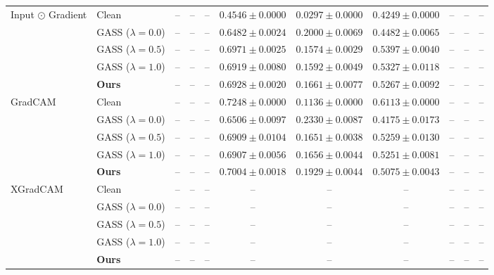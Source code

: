 \begin{table}[t]
{\begin{tabular}{ll|ccc|ccc|ccc}
\multirow{5}{*}{Input $\odot$ Gradient}
& Clean & -- & -- & -- & $0.4546 \pm 0.0000$ & $\mathbf{0.0297 \pm 0.0000}$ & $0.4249 \pm 0.0000$ & -- & -- & -- \\
& GASS ($\lambda=0.0$) & -- & -- & -- & $0.6482 \pm 0.0024$ & $0.2000 \pm 0.0069$ & $0.4482 \pm 0.0065$ & -- & -- & -- \\
& GASS ($\lambda=0.5$) & -- & -- & -- & $\mathbf{0.6971 \pm 0.0025}$ & $0.1574 \pm 0.0029$ & $\mathbf{0.5397 \pm 0.0040}$ & -- & -- & -- \\
& GASS ($\lambda=1.0$) & -- & -- & -- & $0.6919 \pm 0.0080$ & $0.1592 \pm 0.0049$ & $0.5327 \pm 0.0118$ & -- & -- & -- \\
& \textbf{Ours} & -- & -- & -- & $0.6928 \pm 0.0020$ & $0.1661 \pm 0.0077$ & $0.5267 \pm 0.0092$ & -- & -- & -- \\
\midrule

\multirow{5}{*}{GradCAM}
& Clean & -- & -- & -- & $\mathbf{0.7248 \pm 0.0000}$ & $\mathbf{0.1136 \pm 0.0000}$ & $\mathbf{0.6113 \pm 0.0000}$ & -- & -- & -- \\
& GASS ($\lambda=0.0$) & -- & -- & -- & $0.6506 \pm 0.0097$ & $0.2330 \pm 0.0087$ & $0.4175 \pm 0.0173$ & -- & -- & -- \\
& GASS ($\lambda=0.5$) & -- & -- & -- & $0.6909 \pm 0.0104$ & $0.1651 \pm 0.0038$ & $0.5259 \pm 0.0130$ & -- & -- & -- \\
& GASS ($\lambda=1.0$) & -- & -- & -- & $0.6907 \pm 0.0056$ & $0.1656 \pm 0.0044$ & $0.5251 \pm 0.0081$ & -- & -- & -- \\
& \textbf{Ours} & -- & -- & -- & $0.7004 \pm 0.0018$ & $0.1929 \pm 0.0044$ & $0.5075 \pm 0.0043$ & -- & -- & -- \\
\midrule

\multirow{5}{*}{XGradCAM}
& Clean & -- & -- & -- & -- & -- & -- & -- & -- & -- \\
& GASS ($\lambda=0.0$) & -- & -- & -- & -- & -- & -- & -- & -- & -- \\
& GASS ($\lambda=0.5$) & -- & -- & -- & -- & -- & -- & -- & -- & -- \\
& GASS ($\lambda=1.0$) & -- & -- & -- & -- & -- & -- & -- & -- & -- \\
& \textbf{Ours} & -- & -- & -- & -- & -- & -- & -- & -- & -- \\

\bottomrule
\end{tabular}
}

\vspace{0.5cm}


\end{table}
